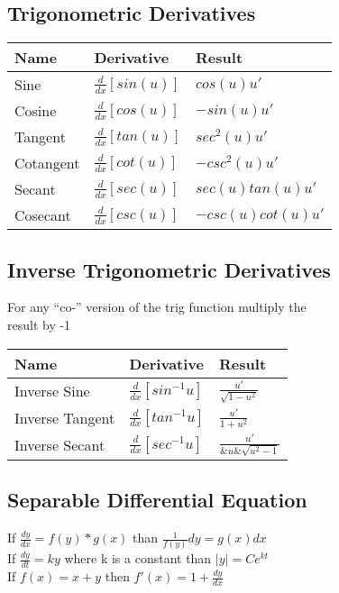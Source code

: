 \documentclass[17pt]{extarticle}
\begin{document}
\subsection{Trigonometric Derivatives}
\renewcommand{\arraystretch}{2}
\begin{table}[H]
\begin{tabular}{|l|l|l|}
\hline
\rowcolor{githublightgray}
Name & Derivative & Result\\
\hline
Sine&$\frac{d}{dx}[sin(u)]$&$cos(u)u\prime$\\
\hline
Cosine&$\frac{d}{dx}[cos(u)]$&$-sin(u)u\prime$\\
\hline
Tangent&$\frac{d}{dx}[tan(u)]$&$sec^2(u)u\prime$\\
\hline
Cotangent&$\frac{d}{dx}[cot(u)]$&$-csc^2(u)u\prime$\\
\hline
Secant&$\frac{d}{dx}[sec(u)]$&$sec(u)tan(u)u\prime$\\
\hline
Cosecant&$\frac{d}{dx}[csc(u)]$&$-csc(u)cot(u)u\prime$\\
\hline
\end{tabular}
\end{table}

\subsection{Inverse Trigonometric Derivatives}
For any ``co-'' version of the trig function multiply the \\result by -1
\renewcommand{\arraystretch}{2}
\begin{table}[H]
\begin{tabular}{|l|l|l|}
\hline
\rowcolor{githublightgray}
Name & Derivative & Result\\
\hline
Inverse Sine&$\frac{d}{dx}[sin^{-1}u]$&$\frac{u\prime}{\sqrt{1-u^2}}$\\
\hline
Inverse Tangent&$\frac{d}{dx}[tan^{-1}u]$&$\frac{u\prime}{1+u^2}$\\
\hline
Inverse Secant&$\frac{d}{dx}[sec^{-1}u]$&$\frac{u\prime}{\&u\&\sqrt{u^2-1}}$\\
\hline
\end{tabular}
\end{table}

\subsection{Separable Differential Equation}
If $\frac{dy}{dx}=f(y)*g(x)$ than $\frac{1}{f(y)}dy=g(x)dx$\\
If $\frac{dy}{dt} = ky$ where k is a constant than $\lvert y\rvert=Ce^{kt}$\\
If $f(x)=x+y$ then $f\prime(x)=1+\frac{dy}{dx}$\\
\clearpage
\end{document}
